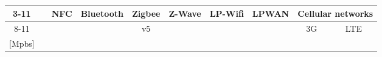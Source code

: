 \documentclass{standalone}
\begin{document}
	\centering
    \begin{tabular}{ c c | c | c | c | c | c | c | c | c | c | }
    \cline{3-11}  
    & & \multirow{2}{*}{NFC} & Bluetooth & \multirow{2}{*}{Zigbee} & \multirow{2}{*}{Z-Wave} & \multirow{2}{*}{LP-Wifi} & \multicolumn{2}{|c|}{LPWAN} & \multicolumn{2}{|c|}{Cellular networks}\\
    \cline{8-11}
    & & & & v5 & & & & & 3G & LTE \\
    \hline                                     
    
    
                        [Mpbs] &     &     &      &          &                &      &        & \\    
    \end{tabular}
\end{document}
